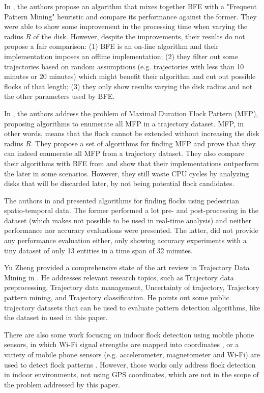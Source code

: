 In \citep{visual}, the authors propose an algorithm that mixes together BFE \citep{vieira} with a "Frequent
Pattern Mining" heuristic and compare its performance against the former. They were able to show some improvement in the
processing time when varying the radius $R$ of the disk. However, despite the improvements, their results do not propose
a fair comparison: (1) BFE is an on-line algorithm and their implementation imposes an offline implementation; (2) they
filter out some trajectories based on random assumptions (e.g. trajectories with less than 10 minutes or 20 minutes)
which might benefit their algorithm and cut out possible flocks of that length; (3) they only show results varying the
disk radius and not the other parameters used by BFE.

In \citep{enumeration}, the authors address the problem of Maximal Duration Flock Pattern (MFP), proposing algorithms
to enumerate all MFP in a trajectory dataset. MFP, in other words, means that the flock cannot be extended without
increasing the disk radius $R$. They propose a set of algorithms for finding MFP and prove that they can indeed
enumerate all MFP from a trajectory dataset. They also compare their algorithms with BFE from \citep{vieira} and show
that their implementations outperform the later in some scenarios. However, they still waste CPU cycles by analyzing
disks that will be discarded later, by not being potential flock candidates.

The authors in \citep{flockpedestrian} and \citep{pedestriancanyons} presented algorithms for finding flocks using
pedestrian spatio-temporal data. The former performed a lot pre- and post-processing in the dataset (which makes not
possible to be used in real-time analysis) and neither performance nor accuracy evaluations were presented. The latter,
did not provide any performance evaluation either, only showing accuracy experiments with a tiny dataset of only 13
entities in a time span of 32 minutes.

Yu Zheng provided a comprehensive state of the art review in Trajectory Data Mining in \citep{survey}. He addresses
relevant research topics, such as Trajectory data preprocessing, Trajectory data management, Uncertainty of trajectory,
Trajectory pattern mining, and Trajectory classification. He points out some public trajectory datasets that can be used
to evaluate pattern detection algorithms, like the dataset in \citep{tdrive} used in this paper.

There are also some work focusing on indoor flock detection using mobile phone sensors, in which Wi-Fi signal strengths
are mapped into coordinates \citep{mobile1}, or a variety of mobile phone sensors (e.g. accelerometer, magnetometer
and Wi-Fi) are used to detect flock patterns \citep{mobile2}. However, those works only address flock detection in
indoor environments, not using GPS coordinates, which are not in the scope of the problem addressed by this paper.

